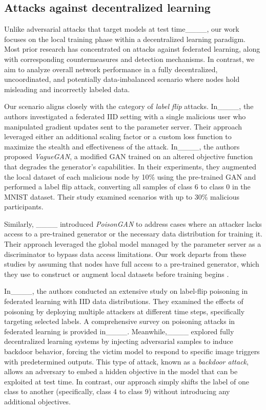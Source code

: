 \subsection{Attacks against decentralized learning}

Unlike adversarial attacks that target models at test time____, our work focuses on the local training phase within a decentralized learning paradigm. Most prior research has concentrated on attacks against federated learning, along with corresponding countermeasures and detection mechanisms. In contrast, we aim to analyze overall network performance in a fully decentralized, uncoordinated, and potentially data-imbalanced scenario where nodes hold misleading and incorrectly labeled data.

Our scenario aligns closely with the category of \textit{label flip} attacks. In____, the authors investigated a federated IID setting with a single malicious user who manipulated gradient updates sent to the parameter server. Their approach leveraged either an additional scaling factor or a custom loss function to maximize the stealth and effectiveness of the attack. In____, the authors proposed \textit{VagueGAN}, a modified GAN trained on an altered objective function that degrades the generator’s capabilities. In their experiments, they augmented the local dataset of each malicious node by 10\% using the pre-trained GAN and performed a label flip attack, converting all samples of class 6 to class 0 in the MNIST dataset. Their study examined scenarios with up to 30\% malicious participants.

Similarly, ____ introduced \textit{PoisonGAN} to address cases where an attacker lacks access to a pre-trained generator or the necessary data distribution for training it. Their approach leveraged the global model managed by the parameter server as a discriminator to bypass data access limitations. Our work departs from these studies by assuming that nodes have full access to a pre-trained generator, which they use to construct or augment local datasets before training begins . %

In____, the authors conducted an extensive study on label-flip poisoning in federated learning with IID data distributions. They examined the effects of poisoning by deploying multiple attackers at different time steps, specifically targeting selected labels. A comprehensive survey on poisoning attacks in federated learning is provided in____. Meanwhile,____ explored fully decentralized learning systems by injecting adversarial samples to induce backdoor behavior, forcing the victim model to respond to specific image triggers with predetermined outputs. This type of attack, known as a \textit{backdoor attack}, allows an adversary to embed a hidden objective in the model that can be exploited at test time. In contrast, our approach simply shifts the label of one class to another (specifically, class 4 to class 9) without introducing any additional objectives.


